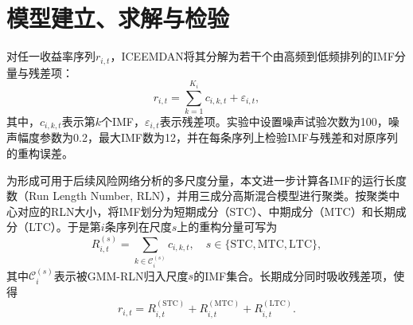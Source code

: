 \begin{table}[H]
\caption{贵金属期货与现货价格数据来源}
\label{tab:data-source}
\begin{normaltable}
\end{normaltable}
\end{table}

\section{模型建立、求解与检验}
对任一收益率序列$r_{i,t}$，ICEEMDAN将其分解为若干个由高频到低频排列的IMF分量与残差项：
\begin{equation}
  r_{i,t}=\sum_{k=1}^{K_i} c_{i,k,t}+\varepsilon_{i,t},
\end{equation}
其中，$c_{i,k,t}$表示第$k$个IMF，$\varepsilon_{i,t}$表示残差项。实验中设置噪声试验次数为100，噪声幅度参数为0.2，最大IMF数为12，并在每条序列上检验IMF与残差和对原序列的重构误差。

为形成可用于后续风险网络分析的多尺度分量，本文进一步计算各IMF的运行长度数（Run Length Number, RLN），并用三成分高斯混合模型进行聚类。按聚类中心对应的RLN大小，将IMF划分为短期成分（STC）、中期成分（MTC）和长期成分（LTC）。于是第$i$条序列在尺度$s$上的重构分量可写为
\begin{equation}
  R_{i,t}^{(s)}=\sum_{k\in \mathcal{C}_{i}^{(s)}}c_{i,k,t},\quad s\in\{\mathrm{STC},\mathrm{MTC},\mathrm{LTC}\},
\end{equation}
其中$\mathcal{C}_{i}^{(s)}$表示被GMM-RLN归入尺度$s$的IMF集合。长期成分同时吸收残差项，使得
\begin{equation}
  r_{i,t}=R_{i,t}^{(\mathrm{STC})}+R_{i,t}^{(\mathrm{MTC})}+R_{i,t}^{(\mathrm{LTC})}.
\end{equation}


